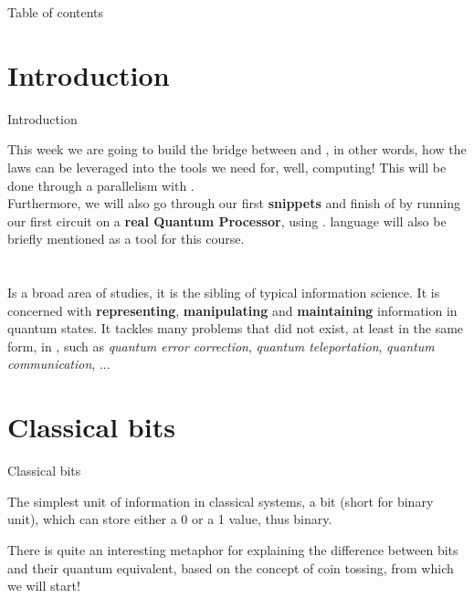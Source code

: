 \documentclass[aspectratio=43]{beamer}
\title{\qis}
\begin{document}
\begin{frame}
	\titlepage
\end{frame}


\begin{frame}{Table of contents}
	\begin{card}
		\tableofcontents
	\end{card}
\end{frame}


\section{Introduction}
\begin{frame}{Introduction}
    \begin{card}
    This week we are going to build the bridge between \textbf{\qm} and \textbf{\qc}, in other words, how the \q laws can be leveraged into the tools we need for, well, computing! This will be done through a parallelism with \cc. \\
    Furthermore, we will also go through our first \textbf{\qk snippets} and finish of by running our first \q circuit on a \textbf{real Quantum Processor}, using \ibmqe. \qasm language will also be briefly mentioned as a tool for this course. 
    \end{card}
\pagenumber
\end{frame}

\section{\qis}
\begin{frame}{\qis}
    \begin{card}
    Is a broad area of studies, it is the \q sibling of typical information science. It is concerned with \textbf{representing}, \textbf{manipulating} and \textbf{maintaining} information in quantum states. It tackles many problems that did not exist, at least in the same form, in \cc, such as \textit{quantum error correction}, \textit{quantum teleportation}, \textit{quantum communication}, ...
    \end{card}
\pagenumber
\end{frame}

\section{Classical bits}
\begin{frame}{Classical bits}
    \begin{card}
    The simplest unit of information in classical systems, a bit (short for binary unit), which can store either a 0 or a 1 value, thus binary. 
    \end{card}
    \begin{card}
    There is quite an interesting metaphor for explaining the difference between bits and their quantum equivalent, based on the concept of coin tossing, from which we will start!
    \end{card}
\pagenumber
\end{frame}
\end{document}
